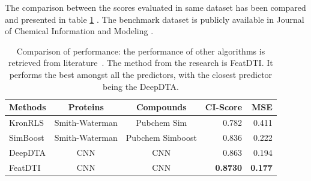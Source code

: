 The comparison between the scores evaluated in same dataset has been compared and presented in table \ref{table:results_comparison} \citep{ozturk2018deepdta}. The benchmark dataset is publicly available in Journal of Chemical Information and Modeling \citep{Tang2013,He2017}.
\begin{table}[H] 
    \centering
    \caption[Results Comparison]{Comparison of performance: the performance of other algorithms is retrieved from literature~\citep{ozturk2018deepdta}. The method from the research is FeatDTI. It performs the best amongst all the predictors, with the closest predictor being the DeepDTA.}
    \label {table:results_comparison}
    \begin{tabular}{|l|c|c|r|r|}
        \hline
        
        Methods & Proteins & Compounds & CI-Score & MSE \\ \hline
        KronRLS & Smith-Waterman & Pubchem Sim & 0.782 & 0.411 \\ \hline
        SimBoost & Smith-Waterman & Pubchem Simboost & 0.836 & 0.222 \\ \hline
        DeepDTA & CNN & CNN & 0.863 & 0.194 \\ \hline
        FeatDTI & CNN & CNN & \textbf{0.8730} & \textbf{0.177} \\ \hline
        
        \end{tabular}
\end{table}
 
